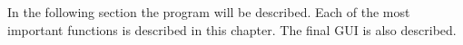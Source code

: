 In the following section the program will be described. Each of the most important functions is described in this chapter. The final GUI is also described.